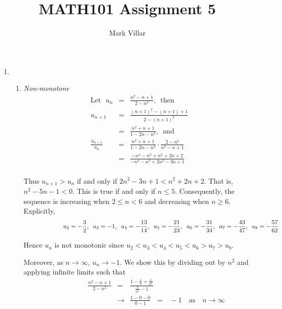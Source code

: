 \documentclass[12pt]{amsart}
\title{MATH101 Assignment 5}
\author{Mark Villar}
\begin{document}
 

\maketitle 

\begin{enumerate}
	
	\item 
		\begin{enumerate}
			\item \emph{Non-monotone}
				\begin{eqnarray}
					\text{Let} \text{ } u_n & = & \frac{n^2-n+1}{2-n^2} \text{, } \text{ then} \nonumber \\
					u_{n+1} & = & \frac{(n+1)^2-(n+1)+1}{2-(n+1)^2} \nonumber \\
					& = & \frac{n^2+n+1}{1-2n-n^2} \text{, } \text{ and} \nonumber \\
					\frac{u_{n+1}}{u_n} & = & \frac{n^2+n+1}{1-2n-n^2} \cdot \frac{2-n^2}{n^2-n+1}
					\nonumber \\
					& = & \frac{-n^4-n^3+n^2+2n+2}{-n^4-n^3+2n^2-3n+1} \nonumber
				\end{eqnarray}\\
			Thus  \hspace{0.05cm} $u_{n+1}>u_n$ \hspace{0.05cm} if and only if \hspace{0.05cm}					$2n^2-3n+1<n^2+2n+2$. That is, \hspace{0.05cm} $n^2-5n-1<0$.  This is true if and only
			if $n \le 5$. Consequently, the sequence is increasing when $2 \le n < 6$ and decreasing
			when $n \ge 6$. Explicitly,
			$$\hspace{2.2cm} u_2=-\frac{3}{2} \text{, } \text{ } u_3=-1  \text{, } \text{ } u_4=-\frac{13}{14} 
			\text{, } \text{ }u_5=-\frac{21}{23} \text{, } \text{ } u_6=-\frac{31}{34} \text{, } \text{ } 
			u_7=-\frac{43}{47} \text{, } \text{ } u_8=-\frac{57}{62}$$
			
			Hence $u_n$ is not monotonic since $u_2<u_3<u_4<u_5<u_6>u_7>u_8$. 
			
			Moreover, as $n \rightarrow \infty \text{, } u_n \rightarrow -1$.  We show this by dividing out by 				$n^2$ and applying infinite limits such that
				\begin{eqnarray}
					\hspace{2cm} \frac{n^2-n+1}{2-n^2} & = & \frac{1-\frac{1}{n}+\frac{1}{n^2}}
					{\frac{2}{n^2} -1} \nonumber \\
					& \longrightarrow & \frac{1-0-0}{0-1} \text{ } = \text{ } -1 \text{ } \text{ as } \text{ } n 
					\longrightarrow \infty \nonumber
				\end{eqnarray}
			

\end{enumerate}
\end{enumerate}
\end{document}
